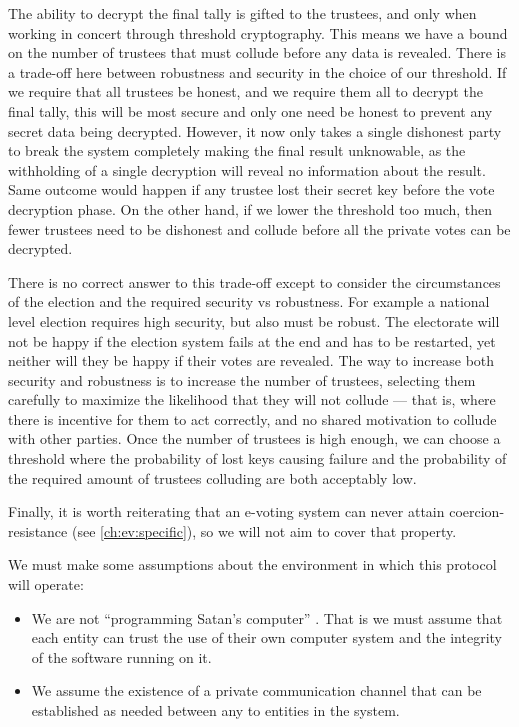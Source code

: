 The ability to decrypt the final tally is gifted to the trustees, and only when working in concert through threshold cryptography. This means we have a bound on the number of trustees that must collude before any data is revealed. There is a trade-off here between robustness and security in the choice of our threshold. If we require that all trustees be honest, and we require them all to decrypt the final tally, this will be most secure and only one need be honest to prevent any secret data being decrypted. However, it now only takes a single dishonest party to break the system completely making the final result unknowable, as the withholding of a single decryption will reveal no information about the result. Same outcome would happen if any trustee lost their secret key before the vote decryption phase. On the other hand, if we lower the threshold too much, then fewer trustees need to be dishonest and collude before all the private votes can be decrypted.

There is no correct answer to this trade-off except to consider the circumstances of the election and the required security vs robustness. For example a national level election requires high security, but also must be robust. The electorate will not be happy if the election system fails at the end and has to be restarted, yet neither will they be happy if their votes are revealed. The way to increase both security and robustness is to increase the number of trustees, selecting them carefully to maximize the likelihood that they will not collude --- that is, where there is incentive for them to act correctly, and no shared motivation to collude with other parties. Once the number of trustees is high enough, we can choose a threshold where the probability of lost keys causing failure and the probability of the required amount of trustees colluding are both acceptably low.

Finally, it is worth reiterating that an e-voting system can never attain coercion-resistance (see \autoref{ch:ev:specific}), so we will not aim to cover that property.

We must make some assumptions about the environment in which this protocol will operate:

\begin{itemize}
    \item We are not ``programming Satan's computer'' \cite{andersonProgrammingSatanComputer1995}. That is we must assume that each entity can trust the use of their own computer system and the integrity of the software running on it.
    \item We assume the existence of a private communication channel that can be established as needed between any to entities in the system.
\end{itemize}

